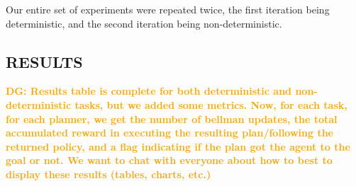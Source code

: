 \documentclass[]{article}
\newcommand{\dgnote}[1]{\textcolor{Orange}{\textbf{DG: #1}}}
\begin{document}
Our entire set of experiments were repeated twice, the first iteration being deterministic, and the second iteration being non-deterministic. 

\subsection{RESULTS}

\dgnote{Results table is {\bf complete} for both deterministic and non-deterministic tasks, but we added some metrics. Now, for each task, for each planner, we get the number of bellman updates, the total accumulated reward in executing the resulting plan/following the returned policy, and a flag indicating if the plan got the agent to the goal or not. We want to chat with everyone about how to best to display these results (tables, charts, etc.)}
\end{document}
